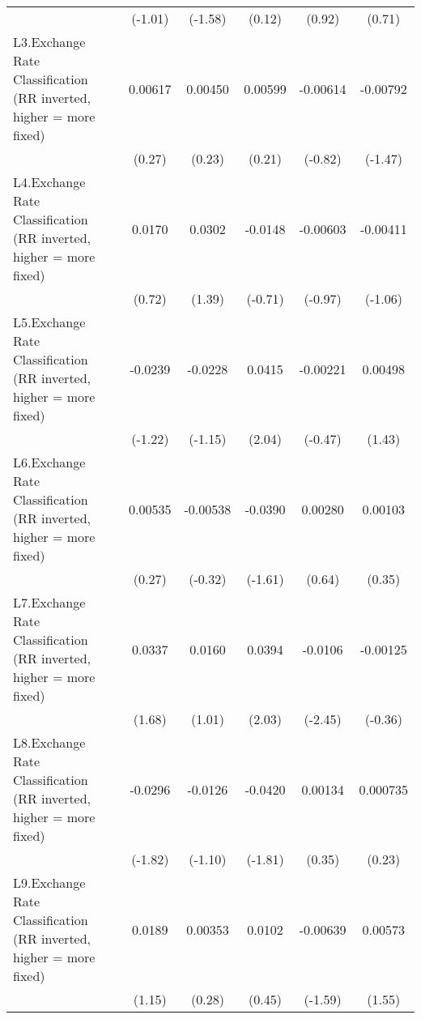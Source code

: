 {\begin{longtable}{l*{5}{c}}
                &  (-1.01)         &  (-1.58)         &   (0.12)         &   (0.92)         &   (0.71)         \\
[1em]
L3.Exchange Rate Classification (RR inverted, higher = more fixed)&  0.00617         &  0.00450         &  0.00599         & -0.00614         & -0.00792         \\
                &   (0.27)         &   (0.23)         &   (0.21)         &  (-0.82)         &  (-1.47)         \\
[1em]
L4.Exchange Rate Classification (RR inverted, higher = more fixed)&   0.0170         &   0.0302         &  -0.0148         & -0.00603         & -0.00411         \\
                &   (0.72)         &   (1.39)         &  (-0.71)         &  (-0.97)         &  (-1.06)         \\
[1em]
L5.Exchange Rate Classification (RR inverted, higher = more fixed)&  -0.0239         &  -0.0228         &   0.0415\sym{*}  & -0.00221         &  0.00498         \\
                &  (-1.22)         &  (-1.15)         &   (2.04)         &  (-0.47)         &   (1.43)         \\
[1em]
L6.Exchange Rate Classification (RR inverted, higher = more fixed)&  0.00535         & -0.00538         &  -0.0390         &  0.00280         &  0.00103         \\
                &   (0.27)         &  (-0.32)         &  (-1.61)         &   (0.64)         &   (0.35)         \\
[1em]
L7.Exchange Rate Classification (RR inverted, higher = more fixed)&   0.0337         &   0.0160         &   0.0394\sym{*}  &  -0.0106\sym{*}  & -0.00125         \\
                &   (1.68)         &   (1.01)         &   (2.03)         &  (-2.45)         &  (-0.36)         \\
[1em]
L8.Exchange Rate Classification (RR inverted, higher = more fixed)&  -0.0296         &  -0.0126         &  -0.0420         &  0.00134         & 0.000735         \\
                &  (-1.82)         &  (-1.10)         &  (-1.81)         &   (0.35)         &   (0.23)         \\
[1em]
L9.Exchange Rate Classification (RR inverted, higher = more fixed)&   0.0189         &  0.00353         &   0.0102         & -0.00639         &  0.00573         \\
                &   (1.15)         &   (0.28)         &   (0.45)         &  (-1.59)         &   (1.55)         \\

\end{longtable}}
